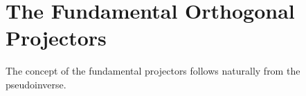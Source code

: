 \chapter{The Fundamental Orthogonal Projectors}

The concept of the fundamental projectors follows naturally from the pseudoinverse.






%


\endinput